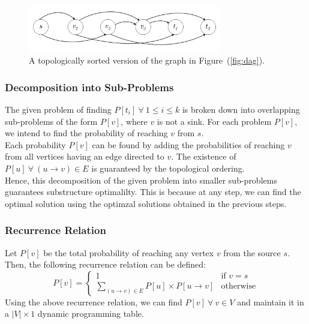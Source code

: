 \documentclass[12pt]{report}
\begin{document}
    \begin{figure}[htp]
        \begin{center}
            \includegraphics[width=0.75\textwidth]{top-sort.png}
        \end{center}
        \caption{A topologically sorted version of the graph in Figure~(\ref{fig:dag}).}
        \label{fig:top-sort}
    \end{figure}

    \subsubsection*{Decomposition into Sub-Problems}
    The given problem of finding $P[t_{i}] \ \forall \ 1 \leq i \leq k$ is broken down into overlapping sub-problems of the form $P[v]$, where $v$ is not a sink.
    For each problem $P[v]$, we intend to find the probability of reaching $v$ from $s$. \\
    Each probability $P[v]$ can be found by adding the probabilities of reaching $v$ from all vertices having an edge directed to $v$.
    The existence of $P[u] \ \forall \ (u \to v) \in E$ is guaranteed by the topological ordering. \\
    Hence, this decomposition of the given problem into smaller sub-problems guarantees substructure optimalilty.
    This is because at any step, we can find the optimal solution using the optimzal solutions obtained in the previous steps.

    \subsubsection*{Recurrence Relation}
    Let $P[v]$ be the total probability of reaching any vertex $v$ from the source $s$.
    Then, the following recurrence relation can be defined:
    \begin{equation}
        P[v] = \begin{cases}
            1 & \text{if } v = s \\
            \sum\limits_{(u \to v) \in E} P[u] \times P[u \to v] & \text{otherwise}
        \end{cases}
    \end{equation}
    Using the above recurrence relation, we can find $P[v] \ \forall \ v \in V$ and maintain it in a $|V| \times 1$ dynamic programming table.
\end{document}
